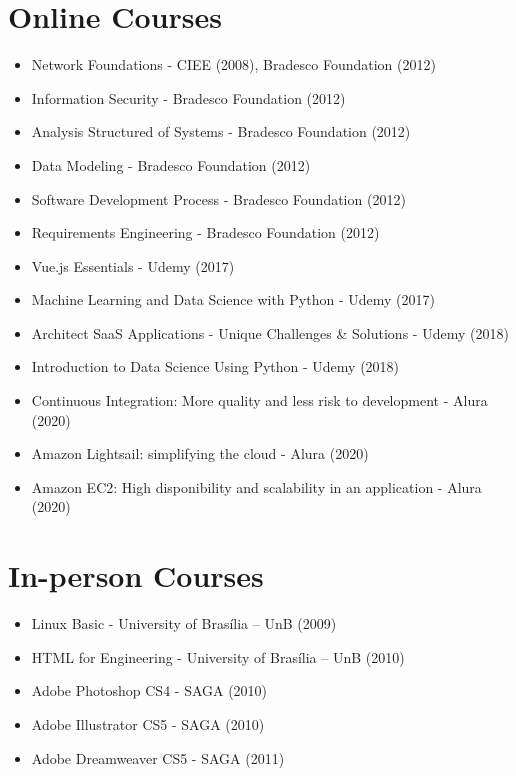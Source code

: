 \section{Online Courses}
\begin{itemize}
    \item Network Foundations - CIEE (2008), Bradesco Foundation (2012)
    \item Information Security - Bradesco Foundation (2012)
    \item Analysis Structured of Systems - Bradesco Foundation (2012)
    \item Data Modeling - Bradesco Foundation (2012)
    \item Software Development Process - Bradesco Foundation (2012)
    \item Requirements Engineering - Bradesco Foundation (2012)
    \item Vue.js Essentials - Udemy (2017)
    \item Machine Learning and Data Science with Python - Udemy (2017)
    \item Architect SaaS Applications - Unique Challenges & Solutions - Udemy (2018)
    \item Introduction to Data Science Using Python - Udemy (2018)
    \item Continuous Integration: More quality and less risk to development - Alura (2020)
    \item Amazon Lightsail: simplifying the cloud - Alura (2020)
    \item Amazon EC2: High disponibility and scalability in an application - Alura (2020)
\end{itemize}

\section{In-person Courses}
\begin{itemize}
    \item Linux Basic - University of Brasília – UnB (2009)
    \item HTML for Engineering - University of Brasília – UnB (2010)
    \item Adobe Photoshop CS4 - SAGA (2010)
    \item Adobe Illustrator CS5 - SAGA (2010)
    \item Adobe Dreamweaver CS5 - SAGA (2011)
\end{itemize}